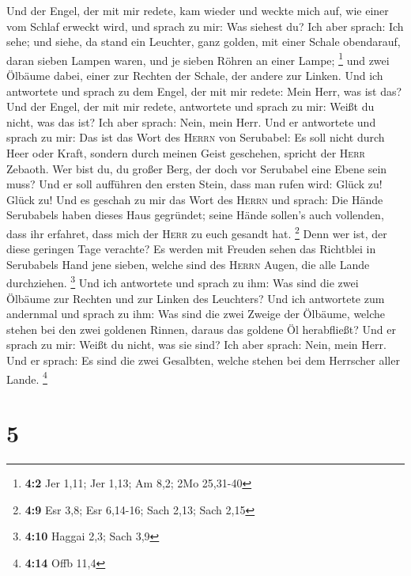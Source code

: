  Und der Engel, der mit mir redete, kam wieder und weckte
mich auf, wie einer vom Schlaf erweckt wird,  und sprach
zu mir: Was siehest du? Ich aber sprach: Ich sehe; und siehe, da stand
ein Leuchter, ganz golden, mit einer Schale obendarauf, daran sieben
Lampen waren, und je sieben Röhren an einer Lampe; \footnote{\textbf{4:2}
  Jer 1,11; Jer 1,13; Am 8,2; 2Mo 25,31-40}  und zwei
Ölbäume dabei, einer zur Rechten der Schale, der andere zur Linken.
 Und ich antwortete und sprach zu dem Engel, der mit mir
redete: Mein Herr, was ist das?  Und der Engel, der mit
mir redete, antwortete und sprach zu mir: Weißt du nicht, was das ist?
Ich aber sprach: Nein, mein Herr.  Und er antwortete und
sprach zu mir: Das ist das Wort des \textsc{Herrn} von Serubabel: Es
soll nicht durch Heer oder Kraft, sondern durch meinen Geist geschehen,
spricht der \textsc{Herr} Zebaoth.  Wer bist du, du großer
Berg, der doch vor Serubabel eine Ebene sein muss? Und er soll aufführen
den ersten Stein, dass man rufen wird: Glück zu! Glück zu!
 Und es geschah zu mir das Wort des \textsc{Herrn} und
sprach:  Die Hände Serubabels haben dieses Haus gegründet;
seine Hände sollen's auch vollenden, dass ihr erfahret, dass mich der
\textsc{Herr} zu euch gesandt hat. \footnote{\textbf{4:9} Esr 3,8; Esr
  6,14-16; Sach 2,13; Sach 2,15}  Denn wer ist, der diese
geringen Tage verachte? Es werden mit Freuden sehen das Richtblei in
Serubabels Hand jene sieben, welche sind des \textsc{Herrn} Augen, die
alle Lande durchziehen. \footnote{\textbf{4:10} Haggai 2,3; Sach 3,9}
 Und ich antwortete und sprach zu ihm: Was sind die zwei
Ölbäume zur Rechten und zur Linken des Leuchters?  Und
ich antwortete zum andernmal und sprach zu ihm: Was sind die zwei Zweige
der Ölbäume, welche stehen bei den zwei goldenen Rinnen, daraus das
goldene Öl herabfließt?  Und er sprach zu mir: Weißt du
nicht, was sie sind? Ich aber sprach: Nein, mein Herr. 
Und er sprach: Es sind die zwei Gesalbten, welche stehen bei dem
Herrscher aller Lande. \footnote{\textbf{4:14} Offb 11,4}

\hypertarget{section-4}{%
\section{5}\label{section-4}}

